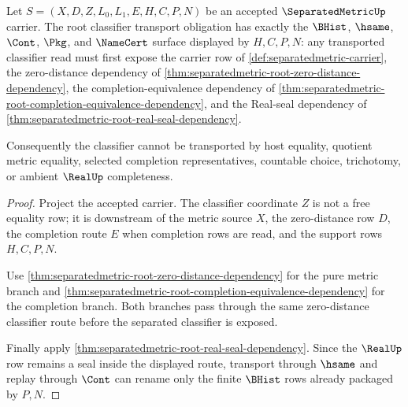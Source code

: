 \begin{theorem}
\label{thm:separatedmetric-root-classifier-transport-obligation}
Let $S=(X,D,Z,L_0,L_1,E,H,C,P,N)$ be an accepted $\SeparatedMetricUp$ carrier. The root classifier transport obligation has exactly the $\BHist$, $\hsame$, $\Cont$, $\Pkg$, and $\NameCert$ surface displayed by $H,C,P,N$: any transported classifier read must first expose the carrier row of \autoref{def:separatedmetric-carrier}, the zero-distance dependency of \autoref{thm:separatedmetric-root-zero-distance-dependency}, the completion-equivalence dependency of \autoref{thm:separatedmetric-root-completion-equivalence-dependency}, and the Real-seal dependency of \autoref{thm:separatedmetric-root-real-seal-dependency}.

Consequently the classifier cannot be transported by host equality, quotient metric equality, selected completion representatives, countable choice, trichotomy, or ambient $\RealUp$ completeness.
\end{theorem}
\begin{proof}
Project the accepted carrier. The classifier coordinate $Z$ is not a free equality row; it is downstream of the metric source $X$, the zero-distance row $D$, the completion route $E$ when completion rows are read, and the support rows $H,C,P,N$.

Use \autoref{thm:separatedmetric-root-zero-distance-dependency} for the pure metric branch and \autoref{thm:separatedmetric-root-completion-equivalence-dependency} for the completion branch. Both branches pass through the same zero-distance classifier route before the separated classifier is exposed.

Finally apply \autoref{thm:separatedmetric-root-real-seal-dependency}. Since the $\RealUp$ row remains a seal inside the displayed route, transport through $\hsame$ and replay through $\Cont$ can rename only the finite $\BHist$ rows already packaged by $P,N$.
\end{proof}

